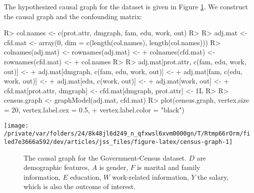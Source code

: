 \documentclass[
  notitle]{jss}
\begin{document}
The hypothesized causal graph for the dataset is given in Figure
\ref{fig:censusgraph}. We construct the causal graph and the confounding
matrix:

\begin{CodeChunk}
\begin{CodeInput}
R> col.names <- c(prot.attr, dmgraph, fam, edu, work, out)
R> 
R> adj.mat <- cfd.mat <- array(0, dim = c(length(col.names), length(col.names)))
R> colnames(adj.mat) <- rownames(adj.mat) <-
+   colnames(cfd.mat) <- rownames(cfd.mat) <-
+   col.names
R> 
R> adj.mat[prot.attr, c(fam, edu, work, out)] <-
+   adj.mat[dmgraph, c(fam, edu, work, out)] <-
+   adj.mat[fam, c(edu, work, out)] <-
+   adj.mat[edu, c(work, out)] <-
+   adj.mat[work, out] <-
+   cfd.mat[prot.attr, dmgraph] <- cfd.mat[dmgraph, prot.attr] <- 1L
R> 
R> census.graph <- graphModel(adj.mat, cfd.mat)
R> plot(census.graph, vertex.size = 20, vertex.label.cex = 0.5,
+   vertex.label.color = "black")
\end{CodeInput}


\begin{center}\texttt{[image: /private/var/folders/24/8k48jl6d249\_n\_qfxwsl6xvm0000gn/T/Rtmp66rOrm/filed7e3666a592/dev/articles/jss\_files/figure-latex/census-graph-1]} \end{center}

\end{CodeChunk}

\begin{figure} \centering
    \caption{The causal graph for the Government-Census dataset. $D$ are demographic features, $A$ is gender, $F$ is marital and family information, $E$ education, $W$ work-related information, $Y$ the salary, which is also the outcome of interest.}
    \label{fig:censusgraph}
\end{figure}
\end{document}
